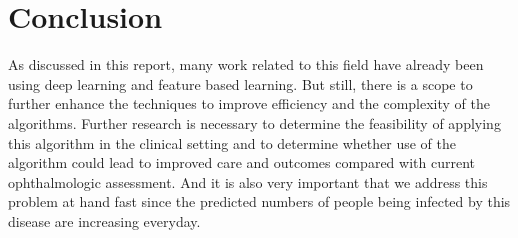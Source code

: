 \documentclass[12pt]{report}
\begin{document}
\chapter{Conclusion}
As discussed in this report, many work related to this field have already been using deep learning and feature based learning. But still, there is a scope to further enhance the techniques to improve efficiency and the complexity of the algorithms. Further research is necessary to determine the feasibility of applying this algorithm in the clinical setting and to determine whether use of the algorithm could lead to improved care and outcomes compared with current ophthalmologic assessment. And it is also very important that we address this problem at hand fast since the predicted numbers of people being infected by this disease are increasing everyday.


\end{document}
